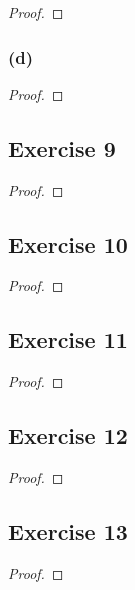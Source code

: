 \documentclass[14pt]{extarticle}
\begin{document}
\begin{proof}

\end{proof}

\subsubsection{(d)}

\begin{proof}

\end{proof}

\subsection{Exercise 9}

\begin{proof}

\end{proof}

\subsection{Exercise 10}

\begin{proof}

\end{proof}

\subsection{Exercise 11}

\begin{proof}

\end{proof}

\subsection{Exercise 12}

\begin{proof}

\end{proof}

\subsection{Exercise 13}

\begin{proof}

\end{proof}
\end{document}
